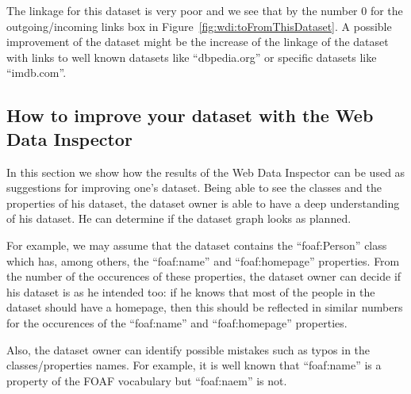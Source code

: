 The linkage for this dataset is very poor and we see that by the number 0 for the outgoing/incoming links box in Figure~\ref{fig:wdi:toFromThisDataset}. A possible improvement of the dataset might be the increase of the linkage of the dataset with links to well known datasets like ``dbpedia.org'' or specific datasets like ``imdb.com''.

\subsection{How to improve your dataset with the Web Data Inspector}

In this section we show how the results of the Web Data Inspector can be used as suggestions for improving one's dataset. Being able to see the classes and the properties of his dataset, the dataset owner is able to have a deep understanding of his dataset. He can determine if the dataset graph looks as planned.

For example, we may assume that the dataset contains the ``foaf:Person'' class which has, among others, the ``foaf:name'' and ``foaf:homepage'' properties. From the number of the occurences of these properties, the dataset owner can decide if his dataset is as he intended too: if he knows that most of the people in the dataset should have a homepage, then this should be reflected in similar numbers for the occurences of the ``foaf:name'' and ``foaf:homepage'' properties.

Also, the dataset owner can identify possible mistakes such as typos in the classes/properties names. For example, it is well known that ``foaf:name'' is a property of the FOAF vocabulary but ``foaf:naem'' is not.
